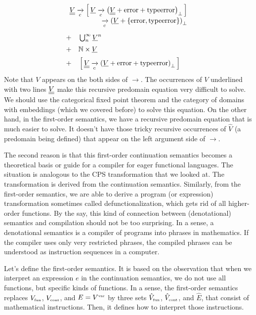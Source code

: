\begin{enumcirc}
\[{\begin{array}{l}
{					\begin{array}{r}
						\underline{\underline{V}} \xrightarrow[c]{}\left[ \, \underline{V} \xrightarrow[c]{}\left( \underline{\underline{V}} + \textrm{error} + \textrm{typeerror} \right)_\bot \, \right] \\
						\xrightarrow[c]{}\left( \underline{V} + \left\{ \textrm{error}, \textrm{typeerror} \right\} \right)_\bot
					\end{array}
				}                                        \\[2em]
				+ \quad \bigcup_n^\infty \underline{V}^n \\[0.5em]
				+ \quad \mathbb{N} \times \underline{V}          \\[0.5em]
				+ \quad \left[ \, \underline{\underline{V}} \xrightarrow[c]{} \left( \underline{V} + \textrm{error} + \textrm{typeerror} \right)_\bot \, \right]
			\end{array}
		}
	\]
	Note that $V$ appears on the both sides of $\to$. The occurrences of $V$
	underlined with two lines $\underline{\underline{V}}$ make this recursive predomain
	equation very difficult to solve.
	We should use the categorical fixed point theorem and the category of domains
	with embeddings (which we covered before) to solve this equation.
	On the other hand, in the first-order semantics, we have a recursive predomain
	equation that is much easier to solve.
	It doesn't have those tricky recursive occurrences of $\hat{V}$ (a predomain
	being defined) that appear on the left argument side of $\to$.

	The second reason is that this first-order continuation semantics becomes a
	theoretical basis or guide for a compiler for eager functional languages.
	The situation is analogous to the CPS transformation that we looked at.
	The transformation is derived from the continuation semantics.
	Similarly, from the first-order semantics, we are able to derive a program (or
	expression) transformation sometimes called defunctionalization, which gets rid
	of all higher-order functions.
	By the say, this kind of connection between (denotational) semantics and
	compilation should not be too surprising.
	In a sense, a denotational semantics is a compiler of programs into phrases in
	mathematics.
	If the compiler uses only very restricted phrases, the compiled phrases can be
	understood as instruction sequences in a computer.
	\item
	Let's define the first-order semantics.
	It is based on the observation that when we interpret an expression $e$ in the
	continuation semantics, we do not use all functions, but specific kinds of
	functions.
	In a sense, the first-order semantics replaces $V_{\textrm{\tiny fun}}$,
	$V_{\textrm{\tiny cont}}$, and $E = V^{\textrm{\tiny var}}$ by three sets
	$\hat{V}_{\textrm{\tiny fun}}$, $\hat{V}_{\textrm{\tiny cont}}$, and $\hat{E}$, that
	consist of mathematical instructions.
	Then, it defines how to interpret those instructions.


\end{enumcirc}
